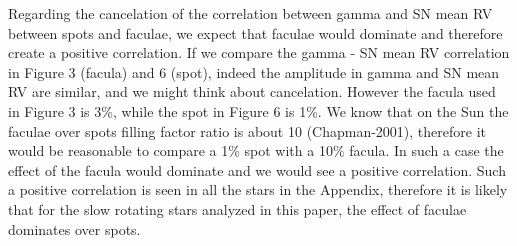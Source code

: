 \documentclass[11pt]{article}   	%
\begin{document}
\begin{enumerate}
Regarding the cancelation of the correlation between gamma and SN mean RV between spots and faculae, we expect that faculae would dominate and therefore create a positive correlation. 
If we compare the gamma - SN mean RV correlation in Figure 3 (facula) and 6 (spot), indeed the amplitude in gamma and SN mean RV are similar, and we might think about cancelation. 
However the facula used in Figure 3 is 3\%, while the spot in Figure 6 is 1\%. 
We know that on the Sun the faculae over spots filling factor ratio is about 10 (Chapman-2001), therefore it would be reasonable to compare a 1\% spot with a 10\% facula. In such a case the effect of the facula would dominate and we would see a positive correlation. Such a positive correlation is seen in all the stars in the Appendix, therefore it is likely that for the slow rotating stars analyzed in this paper, the effect of faculae dominates over spots.


\end{enumerate}
\end{document}
